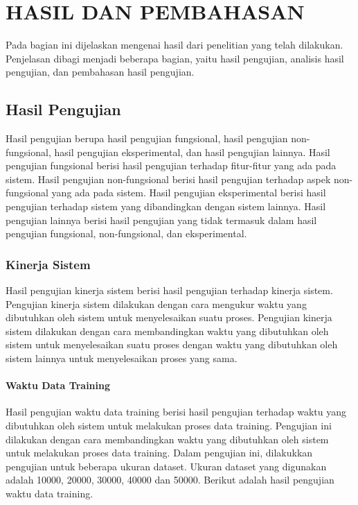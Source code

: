 \chapter{HASIL DAN PEMBAHASAN}
Pada bagian ini dijelaskan mengenai hasil dari penelitian yang telah dilakukan. Penjelasan dibagi menjadi beberapa bagian, yaitu hasil pengujian, analisis hasil pengujian, dan pembahasan hasil pengujian.

\section{Hasil Pengujian}
Hasil pengujian berupa hasil pengujian fungsional, hasil pengujian non-fungsional, hasil pengujian eksperimental, dan hasil pengujian lainnya. Hasil pengujian fungsional berisi hasil pengujian terhadap fitur-fitur yang ada pada sistem. Hasil pengujian non-fungsional berisi hasil pengujian terhadap aspek non-fungsional yang ada pada sistem. Hasil pengujian eksperimental berisi hasil pengujian terhadap sistem yang dibandingkan dengan sistem lainnya. Hasil pengujian lainnya berisi hasil pengujian yang tidak termasuk dalam hasil pengujian fungsional, non-fungsional, dan eksperimental.

\subsection{Kinerja Sistem}
Hasil pengujian kinerja sistem berisi hasil pengujian terhadap kinerja sistem. Pengujian kinerja sistem dilakukan dengan cara mengukur waktu yang dibutuhkan oleh sistem untuk menyelesaikan suatu proses. Pengujian kinerja sistem dilakukan dengan cara membandingkan waktu yang dibutuhkan oleh sistem untuk menyelesaikan suatu proses dengan waktu yang dibutuhkan oleh sistem lainnya untuk menyelesaikan proses yang sama.

\subsubsection{Waktu Data Training}
Hasil pengujian waktu data training berisi hasil pengujian terhadap waktu yang dibutuhkan oleh sistem untuk melakukan proses data training. Pengujian ini dilakukan dengan cara membandingkan waktu yang dibutuhkan oleh sistem untuk melakukan proses data training.
Dalam pengujian ini, dilakukkan pengujian untuk beberapa ukuran dataset. Ukuran dataset yang digunakan adalah 10000, 20000, 30000, 40000 dan 50000. 
Berikut adalah hasil pengujian waktu data training.


